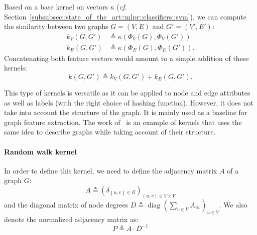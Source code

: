                 Based on a base kernel on vectors $\kappa$ (\textit{cf.} Section~\ref{subsubsec::state_of_the_art::mlpr::classifiers::svm}), we can compute the similarity between two graphs $G = \left(V, E\right)$ and $G' = \left(V', E'\right)$:
                \begin{align}
                    \label{eq::feature_graph_kernel_nodes}
                    k_V(G, G') &\triangleq \kappa(\Phi_V(G), \Phi_V(G'))\\
                    \label{eq::feature_graph_kernel_edges}
                    k_E(G, G') &\triangleq \kappa(\Phi_E(G), \Phi_E(G')).
                \end{align}
                Concatenating both feature vectors would amount to a simple addition of these kernels:
                \begin{equation}
                    \label{eq::feature_graph_kernel_sum}
                    k(G, G') \triangleq k_V(G, G') + k_E(G, G').
                \end{equation}

                This type of kernels is versatile as it can be applied to node and edge attributes as well as labels (with the right choice of hashing function).
                However, it does not take into account the structure of the graph.
                It is mainly used as a baseline for graph feature extraction.
                The work of~\textcite{shervashidze2011weisfeiler} is an example of kernels that uses the same idea to describe graphs while taking account of their structure.
            
            \paragraph{Random walk kernel}
                In order to define this kernel, we need to define the adjacency matrix $A$ of a graph $G$:
                \begin{equation}
                    \label{eq::adjacency_matrix}
                    A \triangleq \left(\delta_{\left\{u,v\right\}\in E}\right)_{(u, v) \in V\times V}
                \end{equation}
                and the diagonal matrix of node degrees $D\triangleq \operatorname{diag}\left(\sum_{v \in V}A_{uv}\right)_{u \in V}$.
                We also denote the normalized adjacency matrix as:
                \begin{equation}
                    \label{eq::normalized_adjacency_matrix}
                    P \triangleq A\cdot D^{-1}
                \end{equation}

